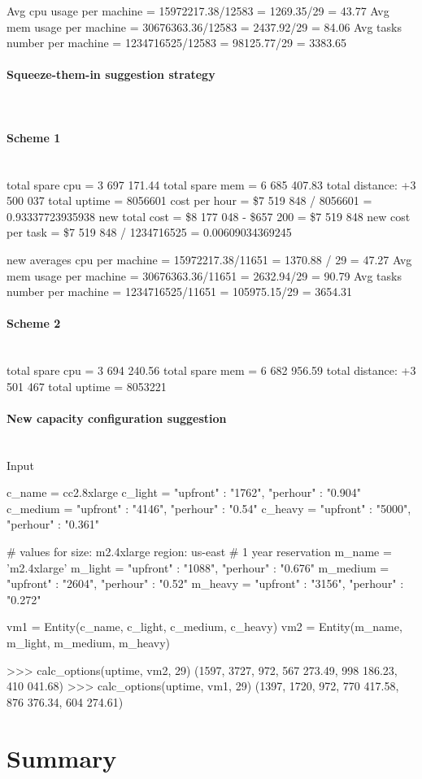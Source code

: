 \documentclass[]{final_report}
\newcommand{\myparagraph}[1]{\paragraph{#1}\mbox{}\\}
\begin{document}
Avg cpu usage per machine = 15972217.38/12583 = 1269.35/29 = 43.77
Avg mem usage per machine = 30676363.36/12583 = 2437.92/29 = 84.06
Avg tasks number per machine = 1234716525/12583 = 98125.77/29 = 3383.65

\myparagraph{Squeeze-them-in suggestion strategy}

\myparagraph{Scheme 1}
total spare cpu = 3 697 171.44
total spare mem = 6 685 407.83
total distance: +3 500 037
total uptime = 8056601
cost per hour = \$7 519 848 / 8056601 = 0.93337723935938
new total cost = \$8 177 048 - \$657 200 = \$7 519 848
new cost per task = \$7 519 848 / 1234716525 = 0.00609034369245

new averages 
cpu per machine = 15972217.38/11651 = 1370.88 / 29 = 47.27
Avg mem usage per machine = 30676363.36/11651 = 2632.94/29 = 90.79
Avg tasks number per machine = 1234716525/11651 = 105975.15/29 = 3654.31

\myparagraph{Scheme 2}
total spare cpu = 3 694 240.56 
total spare mem = 6 682 956.59
total distance: +3 501 467
total uptime = 8053221

\myparagraph{New capacity configuration suggestion}

Input 

c_name = cc2.8xlarge
c_light = "upfront" : "1762", "perhour" : "0.904" 
c_medium =  "upfront" : "4146", "perhour" : "0.54" 
c_heavy =  "upfront" : "5000", "perhour" : "0.361" 

# values for size: m2.4xlarge region: us-east
# 1 year reservation
m_name = 'm2.4xlarge'
m_light =  "upfront" : "1088", "perhour" : "0.676" 
m_medium =  "upfront" : "2604", "perhour" : "0.52" 
m_heavy =  "upfront" : "3156", "perhour" : "0.272" 



vm1 = Entity(c_name, c_light, c_medium, c_heavy)
vm2 = Entity(m_name, m_light, m_medium, m_heavy)

>>> calc_options(uptime, vm2, 29)
(1597, 3727, 972, 567 273.49, 998 186.23, 410 041.68)
>>> calc_options(uptime, vm1, 29)
(1397, 1720, 972, 770 417.58, 876 376.34, 604 274.61)


\section{Summary}


\end{document}
